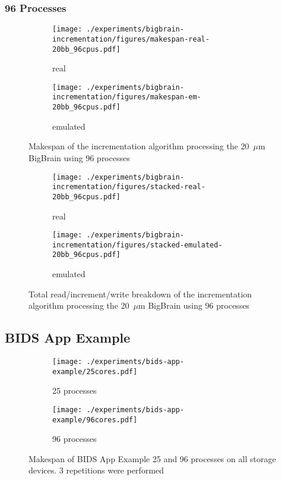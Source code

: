 \documentclass[conference]{IEEEtran}
\begin{document}
\subsubsection{96 Processes}
\begin{figure*}
    \begin{subfigure}{\columnwidth}
        \centering
    \texttt{[image: ./experiments/bigbrain-incrementation/figures/makespan-real-20bb\_96cpus.pdf]}
    \caption{real}
\end{subfigure}
\begin{subfigure}{\columnwidth}
        \centering
    \texttt{[image: ./experiments/bigbrain-incrementation/figures/makespan-em-20bb\_96cpus.pdf]}
    \caption{emulated}
\end{subfigure}
\caption{Makespan of the incrementation algorithm processing the 20~$\mu$m BigBrain using
96 processes}\label{fig:20mksp96}
\end{figure*}

\begin{figure*}
    \begin{subfigure}{\columnwidth}
        \centering
    \texttt{[image: ./experiments/bigbrain-incrementation/figures/stacked-real-20bb\_96cpus.pdf]}
    \caption{real}
\end{subfigure}
\begin{subfigure}{\columnwidth}
        \centering
    \texttt{[image: ./experiments/bigbrain-incrementation/figures/stacked-emulated-20bb\_96cpus.pdf]}
    \caption{emulated}
\end{subfigure}
\caption{Total read/increment/write breakdown of the  incrementation algorithm processing the 20~$\mu$m BigBrain using 96 processes}\label{fig:20stackedp96}
\end{figure*}
\subsection{BIDS App Example}
\begin{figure*}
    \begin{subfigure}{\columnwidth}
        \centering
    \texttt{[image: ./experiments/bids-app-example/25cores.pdf]}
    \caption{25 processes}\label{fig:bm25}
\end{subfigure}
    \begin{subfigure}{\columnwidth}
        \centering
    \texttt{[image: ./experiments/bids-app-example/96cores.pdf]}
    \caption{96 processes}\label{fig:bm96}
\end{subfigure}
\caption{Makespan of BIDS App Example 25 and 96 processes on all storage devices. 3 repetitions were performed}
\end{figure*}
\end{document}

